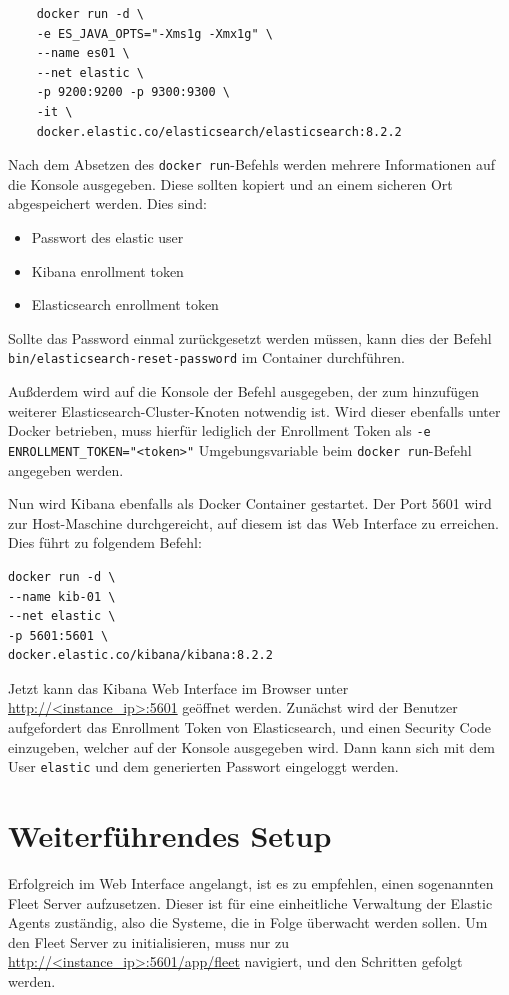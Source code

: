 \begin{verbatim}
	docker run -d \
	-e ES_JAVA_OPTS="-Xms1g -Xmx1g" \
	--name es01 \
	--net elastic \
	-p 9200:9200 -p 9300:9300 \
	-it \
	docker.elastic.co/elasticsearch/elasticsearch:8.2.2
\end{verbatim}

Nach dem Absetzen des \verb|docker run|-Befehls werden 
mehrere Informationen auf die Konsole ausgegeben. Diese sollten
kopiert und an einem sicheren Ort abgespeichert werden.
Dies sind:

\begin{itemize}
	\item Passwort des elastic user
	\item Kibana enrollment token
	\item Elasticsearch enrollment token
\end{itemize}

Sollte das Password einmal zurückgesetzt werden müssen, 
kann dies der Befehl
\verb|bin/elasticsearch-reset-password| im Container durchführen.

Außderdem wird auf die Konsole der Befehl ausgegeben, der zum
hinzufügen weiterer Elasticsearch-Cluster-Knoten notwendig ist.
Wird dieser ebenfalls unter Docker betrieben, muss hierfür lediglich
der Enrollment Token als \verb|-e ENROLLMENT_TOKEN="<token>"| 
Umgebungsvariable beim \verb|docker run|-Befehl angegeben werden.

Nun wird Kibana ebenfalls als Docker Container gestartet.
Der Port 5601 wird zur Host-Maschine durchgereicht,
auf diesem ist das Web Interface zu erreichen.
Dies führt zu folgendem Befehl:

\begin{verbatim}
docker run -d \
--name kib-01 \
--net elastic \
-p 5601:5601 \
docker.elastic.co/kibana/kibana:8.2.2
\end{verbatim}

Jetzt kann das Kibana Web Interface im Browser
unter \url{http://<instance_ip>:5601} geöffnet werden.
Zunächst wird der Benutzer aufgefordert das Enrollment Token
von Elasticsearch,
und einen Security Code einzugeben, welcher auf der Konsole ausgegeben wird.
Dann kann sich mit dem User \verb|elastic| und dem generierten Passwort eingeloggt werden.

\section{Weiterführendes Setup}
Erfolgreich im Web Interface angelangt, ist es zu empfehlen, 
einen sogenannten Fleet Server aufzusetzen. Dieser ist für eine
einheitliche Verwaltung der Elastic Agents zuständig, also
die Systeme, die in Folge überwacht werden sollen. 
Um den Fleet Server zu initialisieren, muss nur zu 
\url{http://<instance_ip>:5601/app/fleet} navigiert,
und den Schritten gefolgt werden.

